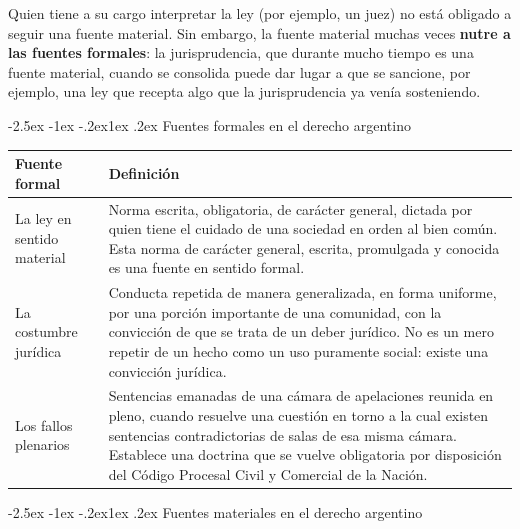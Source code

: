 \documentclass[12pt,oneside]{book}
\makeatletter
\renewcommand\subsection{\@startsection{subsection}{2}{\z@}%
  {-2.5ex \@plus -1ex \@minus -.2ex}{1ex \@plus .2ex}%
  {\normalfont\normalsize\bfseries}}
\makeatother
\begin{document}
Quien tiene a su cargo interpretar la ley (por ejemplo, un juez) no está obligado a seguir una fuente material. Sin embargo, la fuente material muchas veces \textbf{nutre a las fuentes formales}: la jurisprudencia, que durante mucho tiempo es una fuente material, cuando se consolida puede dar lugar a que se sancione, por ejemplo, una ley que recepta algo que la jurisprudencia ya venía sosteniendo.

\subsection{Fuentes formales en el derecho argentino}

\begin{table}[H]
\centering
\begin{tabularx}{\textwidth}{>{\raggedright\arraybackslash}p{} >{\raggedright\arraybackslash}X}
\toprule
\textbf{Fuente formal} & \textbf{Definición} \\
\midrule
La ley en sentido material &
Norma escrita, obligatoria, de carácter general, dictada por quien tiene el cuidado de una sociedad en orden al bien común. Esta norma de carácter general, escrita, promulgada y conocida es una fuente en sentido formal. \\
\addlinespace
La costumbre jurídica &
Conducta repetida de manera generalizada, en forma uniforme, por una porción importante de una comunidad, con la convicción de que se trata de un deber jurídico. No es un mero repetir de un hecho como un uso puramente social: existe una convicción jurídica. \\
\addlinespace
Los fallos plenarios &
Sentencias emanadas de una cámara de apelaciones reunida en pleno, cuando resuelve una cuestión en torno a la cual existen sentencias contradictorias de salas de esa misma cámara. Establece una doctrina que se vuelve obligatoria por disposición del Código Procesal Civil y Comercial de la Nación. \\
\bottomrule
\end{tabularx}
\end{table}

\subsection{Fuentes materiales en el derecho argentino}
\end{document}
